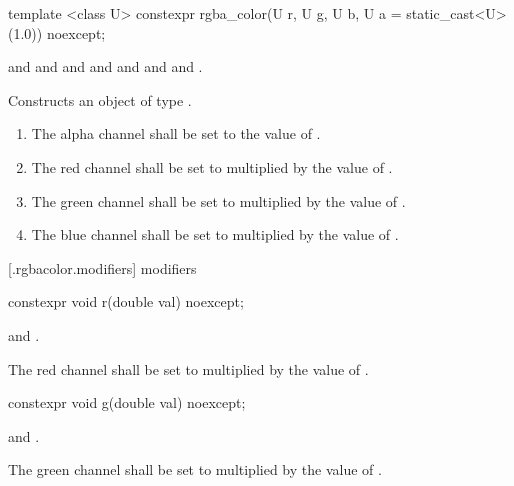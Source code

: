 \begin{itemdecl}
template <class U>
constexpr rgba_color(U r, U g, U b, U a = static_cast<U>(1.0)) noexcept;
\end{itemdecl}
\begin{itemdescr}
\pnum
\requires
{} and  and  and  and  and  and  and .

\pnum
\effects
Constructs an object of type .

\begin{enumerate}
\item The alpha channel shall be set to the value of .
\item The red channel shall be set to  multiplied by the value of  .
\item The green channel shall be set to  multiplied by the value of .
\item The blue channel shall be set to  multiplied by the value of .
\end{enumerate}
\end{itemdescr}


 [\iotwod.rgbacolor.modifiers]{ modifiers}

\begin{itemdecl}
constexpr void r(double val) noexcept;
\end{itemdecl}

\begin{itemdescr}
\pnum
\requires
{} and .

\pnum
\effects
The red channel shall be set to  multiplied by the value of  .
\end{itemdescr}

\begin{itemdecl}
constexpr void g(double val) noexcept;
\end{itemdecl}
\begin{itemdescr}
\pnum
\requires
{} and .

\pnum
\effects
The green channel shall be set to  multiplied by the value of  .
\end{itemdescr}

